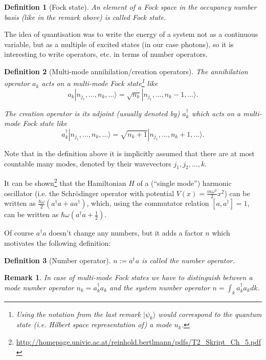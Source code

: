 \documentclass[11pt]{report}
\newtheorem{definition}{Definition}[chapter]
\newtheorem*{remark}{Remark}
\begin{document}
\begin{definition}[Fock state]
	An element of a Fock space in the occupancy number basis (like in the remark above) is called Fock state.
\end{definition}

The idea of quantisation was to write the energy of a system not as a continuous variable, but as a multiple of excited states (in our case photons), so it is interesting to write operators, etc. in terms of number operators.

\begin{definition}[Multi-mode annihilation/creation operators]
	The annihilation operator $a_k$ acts on a multi-mode Fock state\footnote{Using the notation from the last remark $|\psi_k\rangle$ would correspond to the quantum state (i.e. Hilbert space representation of) a mode $u_k$.} like $$a_k|n_{j_1},\dots,n_k,\dots\rangle = \sqrt{n_k}|n_{j_1},\dots,n_k-1,\dots\rangle.$$
	
	The creation operator is its adjoint (usually denoted by) $a_k^\dagger$ which acts on a multi-mode Fock state like $$a_k^\dagger|n_{j_1},\dots,n_k,\dots\rangle = \sqrt{n_k+1}|n_{j_1},\dots,n_k+1,\dots\rangle.$$
\end{definition}

Note that in the definition above it is implicitly assumed that there are at most countable many modes, denoted by their wavevectors $j_1,j_2,\dots, k$.

It can be shown\footnote{\url{http://homepage.univie.ac.at/reinhold.bertlmann/pdfs/T2_Skript_Ch_5.pdf}} that the Hamiltonian $H$ of a (``single mode'') harmonic oscillator (i.e. the Schrödinger operator with potential $V(x)=\frac{m\omega^2}{2}x^2$) can be written as $\frac{\hbar\omega}{2}(a^\dagger a + aa^\dagger)$, which, using the commutator relation $[a,a^\dagger]=1$, can be written as $\hbar\omega(a^\dagger a + \frac{1}{2})$.

Of course $a^\dagger a$ doesn't change any numbers, but it adds a factor $n$ which motivates the following definition:

\begin{definition}[Number operator]
	$n := a^\dagger a$ is called the number operator.
\end{definition}
\begin{remark}
	In case of multi-mode Fock states we have to distinguish between a mode number operator $n_k = a_k^\dagger a_k$ and the system number operator $n = \int_k a_k^\dagger a_k dk$.
\end{remark}
\end{document}
